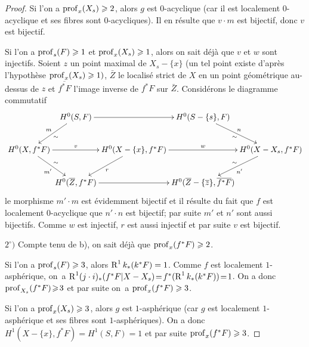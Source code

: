 \begin{proof}
Si l'on a $\operatorname{prof}_x(X_s)\geqslant 2$, alors $g$ est $0$-acyclique (car il est localement $0$-acyclique et ses fibres sont $0$-acycliques). Il en r\'esulte que $v\cdot m$ est bijectif, donc $v$ est bijectif.

Si l'on a $\operatorname{prof}_s(F)\geqslant 1$ et $\operatorname{prof}_x(X_s)\geqslant 1$, alors on sait d\'ej\`a que $v$ et $w$ sont injectifs. Soient $z$ un point maximal de $X_s-\{x\}$ (un tel point existe d'apr\`es l'hypoth\`ese $\operatorname{prof}_x(X_s)\geqslant 1)$, $\bar Z$ le localis\'e strict de $X$ en un point g\'eom\'etrique au-dessus de $z$ et $\overline{f^*F}$ l'image inverse de $f^*F$ sur $\bar Z$. Consid\'erons le diagramme commutatif
\begin{equation*}
\xymatrix@C=0mm{
&H^0(S, F)\ar[rr]\ar[ld]_{m}^{\sim}&&H^0(S-\{s\}, F)\ar[rd]_{\sim}^{n}\\
H^0(X, f^*F)\ar[rr]^-{v}\ar[rd]_{m'}^{\sim}&&H^0(X-\{x\}, f^*F)\ar[rr]^-{w}\ar[ld]^r&& H^0(X-X_s, f^*F)\ar[ld]^{n'}_{\sim}\\
&H^0(\bar Z, f^*F)\ar[rr]&&H^0(\bar Z-\{\bar z\}, \overline{f^*F})}
\end{equation*}
le morphisme $m'\cdot m$ est \'evidemment bijectif et il r\'esulte du fait que $f$ est localement $0$-acyclique que $n'\cdot n$ est bijectif; par suite $m'$ et $n'$ sont aussi bijectifs. Comme $w$ est injectif, $r$ est aussi injectif et par suite $v$ est bijectif.

$2^\circ)$ Compte tenu de b), on sait d\'ej\`a que $\operatorname{prof}_x(f^*F)\geqslant 2$.

Si l'on a $\operatorname{prof}_s(F)\geqslant 3$, alors $\operatorname{R}^1k_*(k^*F)=1$. Comme $f$ est localement $1$-asph\'erique, on~a $\operatorname{R}^1(j\cdot i)_*(f^*F{|X-X_s})\!=\!f^*(\operatorname{R}^1k_*(k^*F))\!=\!1$. On a donc \hbox{$\operatorname{prof}_{X_s}(f^*F)\!\geqslant\! 3$} et par suite on~a $\operatorname{prof}_x(f^*F)\geqslant 3$.

Si l'on a $\operatorname{prof}_x(X_s)\geqslant 3$, alors $g$ est $1$-asph\'erique (car $g$ est localement $1$-asph\'erique et ses fibres sont $1$-asph\'eriques). On a donc $H^1(X-\{x\}, f^*F)=H^1(S, F)=1$ et par suite $\operatorname{prof}_x(f^*F)\geqslant 3$.


\end{proof}
